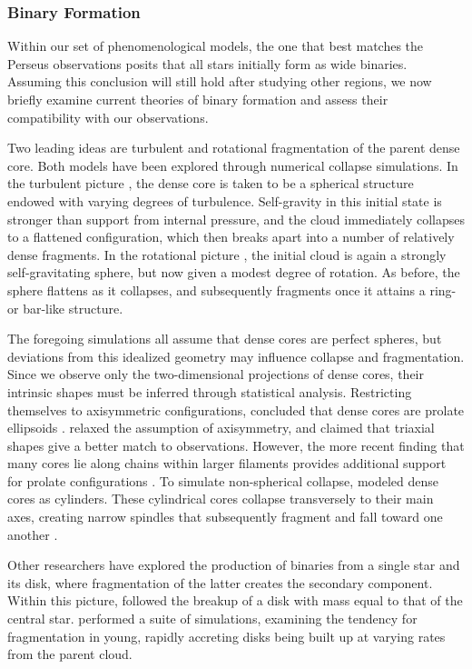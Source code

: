 \documentclass[usenatbib,a4paper]{mnras}
\begin{document}
\subsubsection{Binary Formation}\label{formation}

Within our set of phenomenological models, the one that best matches the Perseus observations posits that all stars initially form as wide binaries. Assuming this conclusion will still hold after studying other regions, we now briefly examine current theories of binary formation and assess their compatibility with our observations. 

Two leading ideas are turbulent and rotational fragmentation of the parent dense core. Both models have been explored through numerical collapse simulations. In the turbulent picture \citep[e.g.,][]{Goodwin04, Offner10, Offner16}, the dense core is taken to be a spherical structure endowed with varying degrees of turbulence.  Self-gravity in this initial state is stronger than support from internal pressure, and the cloud immediately collapses to a flattened configuration, which then breaks apart into a number of relatively dense fragments.  In the rotational picture \citep[e.g.,][]{Hennebelle04, Machida08, Klapp14}, the initial cloud is again a strongly self-gravitating sphere, but now given a modest degree of rotation.  As before, the sphere flattens as it collapses, and subsequently fragments once it attains a ring- or bar-like structure.  

The foregoing simulations all assume that dense cores are perfect spheres, but deviations from this idealized geometry may influence collapse and fragmentation.  Since we observe only the two-dimensional projections of dense cores, their intrinsic shapes must be inferred through statistical analysis. Restricting themselves to axisymmetric configurations, \citet{Myers91} concluded that dense cores are prolate ellipsoids \citep[see also][]{Ryden96, Curry02}.   \citet{JonesBasu02} relaxed the assumption of axisymmetry, and claimed that triaxial shapes give a better match to observations.  However, the more recent finding that many cores lie along chains within larger filaments provides additional support for prolate configurations \citep[e.g.,][]{TafallaHacar15}.  To simulate non-spherical collapse, \citet{Bonnell91} modeled dense cores as cylinders.  These cylindrical cores collapse transversely to their main axes, creating narrow spindles that subsequently fragment and fall toward one another \citep[see also][]{Pon11}.

Other researchers have explored the production of binaries from a single star and its disk, where fragmentation of the latter creates the secondary component.   Within this picture, \citet{StamatellosWhitworth09} followed the breakup of a disk with mass equal to that of the central star.  \citet{Kratter10} performed a suite of simulations, examining the tendency for fragmentation in young, rapidly accreting disks being built up at varying rates from the parent cloud. 
\end{document}
